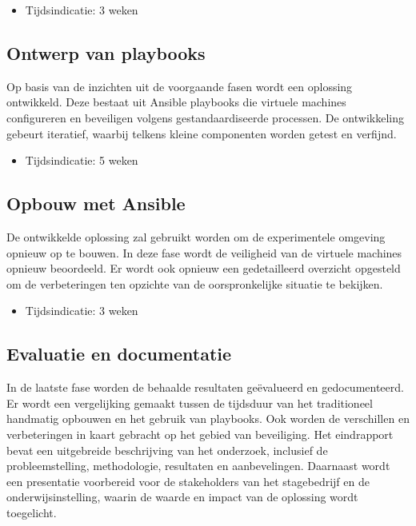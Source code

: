 \begin{itemize}
  \item Tijdsindicatie: 3 weken
\end{itemize}

\subsection{Ontwerp van playbooks}%

Op basis van de inzichten uit de voorgaande fasen wordt een oplossing ontwikkeld.
Deze bestaat uit Ansible playbooks die virtuele machines configureren en beveiligen volgens gestandaardiseerde processen.
De ontwikkeling gebeurt iteratief, waarbij telkens kleine componenten worden getest en verfijnd.

\begin{itemize}
  \item Tijdsindicatie: 5 weken
\end{itemize}

\subsection{Opbouw met Ansible}%

De ontwikkelde oplossing zal gebruikt worden om de experimentele omgeving opnieuw op te bouwen.
In deze fase wordt de veiligheid van de virtuele machines opnieuw beoordeeld. 
Er wordt ook opnieuw een gedetailleerd overzicht opgesteld om de verbeteringen ten opzichte van de oorspronkelijke situatie te bekijken.

\begin{itemize}
  \item Tijdsindicatie: 3 weken
\end{itemize}

\subsection{Evaluatie en documentatie}%

In de laatste fase worden de behaalde resultaten geëvalueerd en gedocumenteerd.
Er wordt een vergelijking gemaakt tussen de tijdsduur van het traditioneel handmatig opbouwen en het gebruik van playbooks.
Ook worden de verschillen en verbeteringen in kaart gebracht op het gebied van beveiliging.
Het eindrapport bevat een uitgebreide beschrijving van het onderzoek, inclusief de probleemstelling, methodologie, resultaten en aanbevelingen.
Daarnaast wordt een presentatie voorbereid voor de stakeholders van het stagebedrijf en de onderwijsinstelling, waarin de waarde en impact van de oplossing wordt toegelicht.

